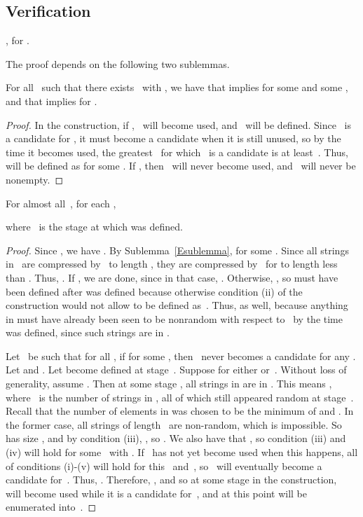 \documentclass{LMCS}
\newcommand{\0}{\mathbf{0}}
\newcommand{\<}{\langle}
\renewcommand{\>}{\rangle}
\begin{document}
\subsection{Verification}

\begin{lem}\label{ttlemma}
, for .
\end{lem}

The proof depends on the following two sublemmas.

\begin{slem}
\label{Esublemma} For all~ such that there exists~ with ,
we have that  implies  for some  and some , and that  implies
 for .
\end{slem}

\begin{proof}
In the construction, if ,~ will become used, and~ will
be defined.  Since~ is a candidate for , it must become a
candidate when it is still unused, so by the time it becomes used, the
greatest~ for which~ is a candidate is at least~.
Thus,~ will be defined as  for some . If
, then~ will never become used, and~ will never be
nonempty.
\end{proof}

\begin{slem}\label{containment}
For almost all~, for each ,

where~ is the stage at which  was defined.
\end{slem}

\begin{proof}
 Since ,
we have .  By  Sublemma~\ref{Esublemma},  for
some .   Since all strings in~ are compressed
by~ to length , they are compressed by~ for  to
length less than .    Thus, .
If , we are done, since in that case, .  Otherwise, , so  must have been defined after 
was defined because otherwise condition (ii) of the construction would not
allow  to be defined as~.
Thus,  as well, because anything
in  must have already been seen to be nonrandom
with respect to~ by the time  was defined, since such
strings are in .

 Let~ be such that for all , if 
for some , then~ never becomes a candidate for any .
Let  and . Let  become defined at
stage~. Suppose  for either
 or~. Without loss of generality, assume .
Then at some stage , all strings in  are in .
This means , where~ is the number of strings
in , all of which still appeared random at stage~. Recall
that the number of elements in  was chosen to be the minimum
of  and . In the former case, all strings of
length~ are non-random, which is impossible. So  has size
, and by condition (iii), ,
so . We also have that , so condition (iii) and (iv) will hold for some~ with
. If~ has not yet become used when this happens, all of
conditions (i)-(v) will hold for this~ and~, so~ will eventually
become a candidate for~. Thus, . Therefore, , and
so at some stage in the construction,~ will become used while it is a
candidate for~, and at this point 
will be enumerated into~.
\end{proof}
\end{document}
